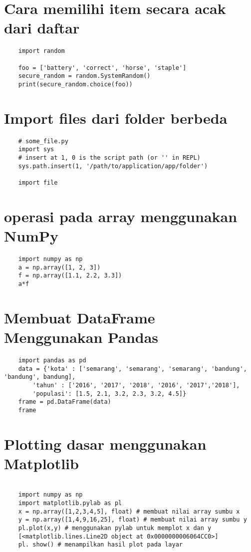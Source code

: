 \documentclass[12pt]{article} %
\begin{document}
\section{Cara memilihi item secara acak dari daftar}
\begin{lstlisting}
	import random
	
	foo = ['battery', 'correct', 'horse', 'staple']
	secure_random = random.SystemRandom()
	print(secure_random.choice(foo))
\end{lstlisting}

\section {Import files dari folder berbeda}
\begin{lstlisting}
	# some_file.py
	import sys
	# insert at 1, 0 is the script path (or '' in REPL)
	sys.path.insert(1, '/path/to/application/app/folder')
	
	import file
\end{lstlisting}

\section {operasi pada array menggunakan NumPy}
\begin{lstlisting}
	import numpy as np
	a = np.array([1, 2, 3])
	f = np.array([1.1, 2.2, 3.3])
	a*f
\end{lstlisting}

\section {Membuat DataFrame Menggunakan Pandas}
\begin{lstlisting}
	import pandas as pd
	data = {'kota' : ['semarang', 'semarang', 'semarang', 'bandung', 'bandung', bandung],
		'tahun' : ['2016', '2017', '2018', '2016', '2017','2018'],
		'populasi': [1.5, 2.1, 3.2, 2.3, 3.2, 4.5]}
	frame = pd.DataFrame(data)
	frame
\end{lstlisting}

\section {Plotting dasar menggunakan Matplotlib}
\begin{lstlisting}

	import numpy as np
	import matplotlib.pylab as pl
	x = np.array([1,2,3,4,5], float) # membuat nilai array sumbu x
	y = np.array([1,4,9,16,25], float) # membuat nilai array sumbu y
	pl.plot(x,y) # menggunakan pylab untuk memplot x dan y
	[<matplotlib.lines.Line2D object at 0x0000000006064CC0>]
	pl. show() # menampilkan hasil plot pada layar
\end{lstlisting}
\end{document}
